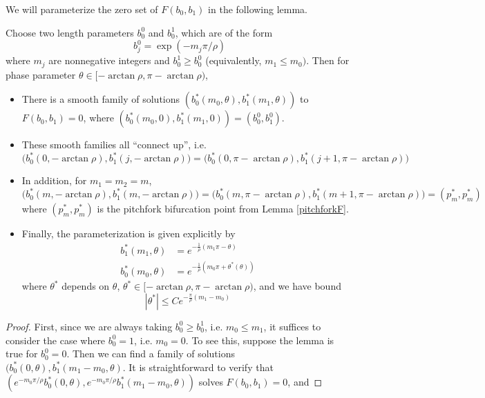 \documentclass[thesis.tex]{subfiles}
\begin{document}
We will parameterize the zero set of $F(b_0, b_1)$ in the following lemma.


\begin{lemma}\label{thetaparam}
Choose two length parameters $b_0^0$ and $b_0^1$, which are of the form 
\begin{equation}\label{bj0form}
b_j^0 = \exp(-m_j \pi / \rho )
\end{equation}
where $m_j$ are nonnegative integers and $b_0^1 \geq b_0^0$ (equivalently, $m_1 \leq m_0)$. Then for phase parameter $\theta \in [-\arctan \rho,\pi - \arctan \rho)$, 

\begin{itemize}
\item There is a smooth family of solutions $( b_0^*(m_0, \theta), b_1^*(m_1, \theta) )$ to $F(b_0, b_1) = 0$, where $(b_0^*(m_0, 0), b_1^*(m_1, 0)) = (b_0^0, b_1^0)$.\\

\item These smooth families all ``connect up'', i.e.
\[
\Big( b_0^*(0, -\arctan \rho), b_1^*(j, -\arctan \rho) \Big) = \Big( b_0^*(0, \pi - \arctan \rho), b_1^*(j+1, \pi - \arctan \rho) \Big)
\]

\item In addition, for $m_1 = m_2 = m$, 
\[
\Big( b_0^*(m, -\arctan \rho), b_1^*(m, -\arctan \rho) \Big) = \Big( b_0^*(m, \pi - \arctan \rho), b_1^*(m+1, \pi - \arctan \rho) \Big) = (p^*_m, p^*_m)
\] 
where $(p^*_m, p^*_m)$ is the pitchfork bifurcation point from Lemma \ref{pitchforkF}.

\item Finally, the parameterization is given explicitly by
\begin{align*}
b_1^*(m_1, \theta) &= e^{-\frac{1}{\rho}(m_1 \pi - \theta) } \\
b_0^*(m_0, \theta) &= e^{-\frac{1}{\rho}(m_0 \pi + \theta^*(\theta)) }
\end{align*}
where $\theta^*$ depends on $\theta$, $\theta^* \in [-\arctan \rho,\pi - \arctan \rho)$, and we have bound
\[
|\theta^*| \leq C e^{ -\frac{\pi}{\rho}(m_1 - m_0)}
\]
\end{itemize}

\begin{proof}

First, since we are always taking $b_0^0 \geq b_0^1$, i.e. $m_0 \leq m_1$, it suffices to consider the case where $b_0^0 = 1$, i.e. $m_0 = 0$. To see this, suppose the lemma is true for $b_0^0 = 0$. Then we can find a family of solutions $(b_0^*(0, \theta), b_1^*(m_1 - m_0, \theta)$. It is straightforward to verify that $(e^{-m_0 \pi/\rho} b_0^*(0, \theta), e^{-m_0 \pi/\rho} b_1^*(m_1 - m_0, \theta))$ solves $F(b_0, b_1) = 0$, and 


\end{proof}
\end{lemma}
\end{document}

